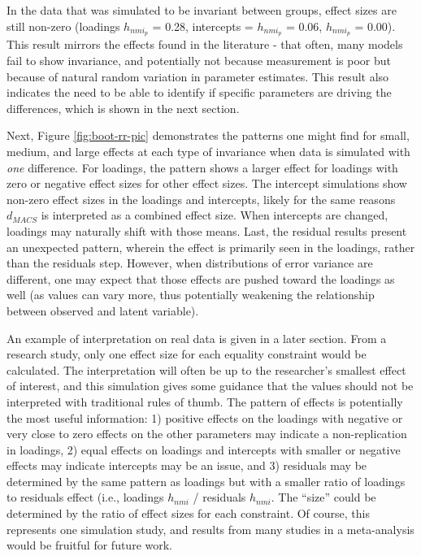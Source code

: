 \documentclass[
  man]{apa7}
\begin{document}
In the data that was simulated to be invariant between groups, effect sizes are still non-zero (loadings \(h_{nmi_p}\) = 0.28, intercepts = \(h_{nmi_p}\) = 0.06, \(h_{nmi_p}\) = 0.00). This result mirrors the effects found in the literature - that often, many models fail to show invariance, and potentially not because measurement is poor but because of natural random variation in parameter estimates. This result also indicates the need to be able to identify if specific parameters are driving the differences, which is shown in the next section.

Next, Figure \ref{fig:boot-rr-pic} demonstrates the patterns one might find for small, medium, and large effects at each type of invariance when data is simulated with \emph{one} difference. For loadings, the pattern shows a larger effect for loadings with zero or negative effect sizes for other effect sizes. The intercept simulations show non-zero effect sizes in the loadings and intercepts, likely for the same reasons \(d_{MACS}\) is interpreted as a combined effect size. When intercepts are changed, loadings may naturally shift with those means. Last, the residual results present an unexpected pattern, wherein the effect is primarily seen in the loadings, rather than the residuals step. However, when distributions of error variance are different, one may expect that those effects are pushed toward the loadings as well (as values can vary more, thus potentially weakening the relationship between observed and latent variable).

An example of interpretation on real data is given in a later section. From a research study, only one effect size for each equality constraint would be calculated. The interpretation will often be up to the researcher's smallest effect of interest, and this simulation gives some guidance that the values should not be interpreted with traditional rules of thumb. The pattern of effects is potentially the most useful information: 1) positive effects on the loadings with negative or very close to zero effects on the other parameters may indicate a non-replication in loadings, 2) equal effects on loadings and intercepts with smaller or negative effects may indicate intercepts may be an issue, and 3) residuals may be determined by the same pattern as loadings but with a smaller ratio of loadings to residuals effect (i.e., loadings \(h_{nmi}\) / residuals \(h_{nmi}\). The ``size'' could be determined by the ratio of effect sizes for each constraint. Of course, this represents one simulation study, and results from many studies in a meta-analysis would be fruitful for future work.
\end{document}
